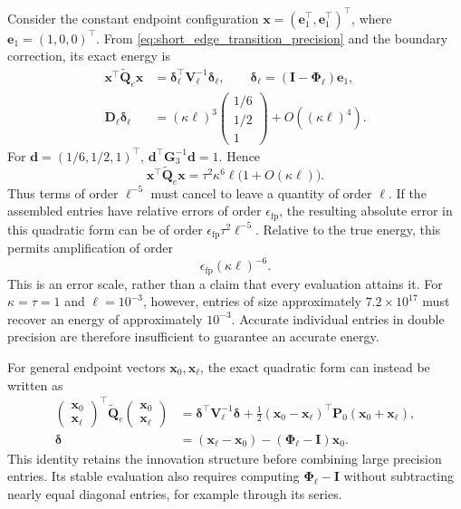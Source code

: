 \documentclass[11pt,a4paper]{article}
\theoremstyle{plain}
\theoremstyle{definition}
\begin{document}
Consider the constant endpoint configuration
$\mathbf x=(\mathbf e_1^\top,\mathbf e_1^\top)^\top$, where
$\mathbf e_1=(1,0,0)^\top$. From
\eqref{eq:short_edge_transition_precision} and the boundary correction,
its exact energy is
\begin{align}
\mathbf x^\top\widetilde{\mathbf Q}_e\mathbf x
&=\boldsymbol\delta_\ell^\top\mathbf V_\ell^{-1}
  \boldsymbol\delta_\ell,
\qquad
\boldsymbol\delta_\ell=(\mathbf I-\boldsymbol\Phi_\ell)\mathbf e_1,\\
\mathbf D_\ell\boldsymbol\delta_\ell
&=(\kappa\ell)^3
 \begin{pmatrix}1/6\\1/2\\1\end{pmatrix}
 +O((\kappa\ell)^4).
\end{align}
For $\mathbf d=(1/6,1/2,1)^\top$,
$\mathbf d^\top\mathbf G_3^{-1}\mathbf d=1$. Hence
\begin{equation}
\boxed{\quad
\mathbf x^\top\widetilde{\mathbf Q}_e\mathbf x
=\tau^2\kappa^6\ell\bigl(1+O(\kappa\ell)\bigr).
\quad}
\label{eq:short_edge_constant_energy}
\end{equation}
Thus terms of order $\ell^{-5}$ must cancel to leave a quantity of
order $\ell$. If the assembled entries have relative errors of order
$\epsilon_{\mathrm{fp}}$, the resulting absolute error in this
quadratic form can be of order
$\epsilon_{\mathrm{fp}}\tau^2\ell^{-5}$. Relative to the true energy,
this permits amplification of order
\begin{equation}
\epsilon_{\mathrm{fp}}(\kappa\ell)^{-6}.
\label{eq:short_edge_energy_roundoff}
\end{equation}
This is an error scale, rather than a claim that every evaluation
attains it. For $\kappa=\tau=1$ and $\ell=10^{-3}$, however, entries
of size approximately $7.2\times10^{17}$ must recover an energy of
approximately $10^{-3}$. Accurate individual entries in double
precision are therefore insufficient to guarantee an accurate energy.

For general endpoint vectors $\mathbf x_0,\mathbf x_\ell$, the exact
quadratic form can instead be written as
\begin{align}
\begin{pmatrix}\mathbf x_0\\\mathbf x_\ell\end{pmatrix}^{\!\top}
\widetilde{\mathbf Q}_e
\begin{pmatrix}\mathbf x_0\\\mathbf x_\ell\end{pmatrix}
&=\boldsymbol\delta^\top\mathbf V_\ell^{-1}\boldsymbol\delta
 +\frac12(\mathbf x_0-\mathbf x_\ell)^\top
 \mathbf P_0(\mathbf x_0+\mathbf x_\ell),\\
\boldsymbol\delta
&=(\mathbf x_\ell-\mathbf x_0)
 -(\boldsymbol\Phi_\ell-\mathbf I)\mathbf x_0.
\label{eq:short_edge_factored_energy}
\end{align}
This identity retains the innovation structure before combining large
precision entries. Its stable evaluation also requires computing
$\boldsymbol\Phi_\ell-\mathbf I$ without subtracting nearly equal
diagonal entries, for example through its series.
\end{document}
